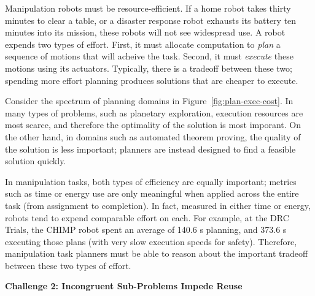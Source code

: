 
Manipulation robots must be resource-efficient.
If a home robot takes thirty minutes to clear a table,
or a disaster response robot exhausts its battery ten minutes
into its mission,
these robots will not see widespread use.
A robot expends two types of effort.
First, it must allocate computation to \emph{plan}
a sequence of motions that will acheive the task.
Second, it must \emph{execute} these motions using its actuators.
Typically, there is a tradeoff between these two;
spending more effort planning produces solutions that are
cheaper to execute.

Consider the spectrum of planning domains
in Figure~\ref{fig:plan-exec-cost}.
In many types of problems,
such as planetary exploration,
execution resources are most scarce,
and therefore the optimality of the solution is most imporant.
On the other hand,
in domains such as automated theorem proving,
the quality of the solution is less important;
planners are instead designed to find a feasible solution quickly.

In manipulation tasks,
both types of efficiency are equally important;
metrics such as time or energy use are only meaningful
when applied across the entire task (from assignment to completion).
In fact, measured in either time or energy,
robots tend to expend comparable effort on each.
For example, at the DRC Trials,
the CHIMP robot spent an average of 140.6 s planning,
and 373.6 s executing those plans
(with very slow execution speeds for safety).
Therefore,
manipulation task planners must be able to reason about
the important tradeoff between these two types of effort.

\vspace{0.1in}
\noindent
\textbf{Challenge 2: Incongruent Sub-Problems Impede Reuse}

